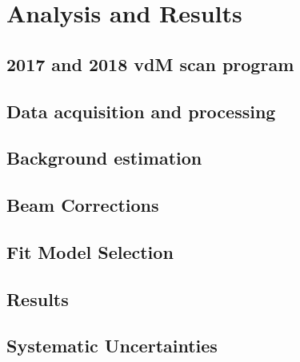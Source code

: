 \chapter{Analysis and Results}


\section{2017 and 2018 vdM scan program}
\label{2017 and 2018 vdM scan program}

\section{Data acquisition and processing}
\label{data}


\section{Background estimation}
\label{bkg}


\section{Beam Corrections}
\label{bbcorrections}

\section{Fit Model  Selection}


\section{Results}



\section{Systematic Uncertainties}



